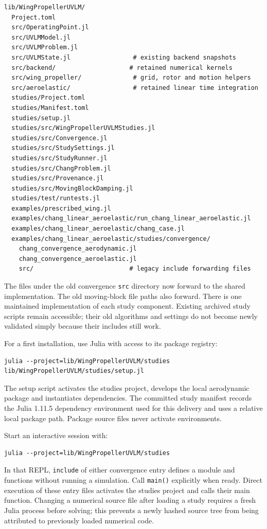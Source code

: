 \documentclass[11pt,a4paper]{article}
\newcommand{\code}{\nolinkurl}
\begin{document}
\begin{lstlisting}
lib/WingPropellerUVLM/
  Project.toml
  src/OperatingPoint.jl
  src/UVLMModel.jl
  src/UVLMProblem.jl
  src/UVLMState.jl                 # existing backend snapshots
  src/backend/                    # retained numerical kernels
  src/wing_propeller/              # grid, rotor and motion helpers
  src/aeroelastic/                 # retained linear time integration
  studies/Project.toml
  studies/Manifest.toml
  studies/setup.jl
  studies/src/WingPropellerUVLMStudies.jl
  studies/src/Convergence.jl
  studies/src/StudySettings.jl
  studies/src/StudyRunner.jl
  studies/src/ChangProblem.jl
  studies/src/Provenance.jl
  studies/src/MovingBlockDamping.jl
  studies/test/runtests.jl
  examples/prescribed_wing.jl
  examples/chang_linear_aeroelastic/run_chang_linear_aeroelastic.jl
  examples/chang_linear_aeroelastic/chang_case.jl
  examples/chang_linear_aeroelastic/studies/convergence/
    chang_convergence_aerodynamic.jl
    chang_convergence_aeroelastic.jl
    src/                          # legacy include forwarding files
\end{lstlisting}

The files under the old convergence \code{src} directory now forward to the
shared implementation. The old moving-block file paths also forward. There
is one maintained implementation of each study component. Existing archived
study scripts remain accessible; their old algorithms and settings do not
become newly validated simply because their includes still work.

For a first installation, use Julia with access to its package registry:
\begin{lstlisting}
julia --project=lib/WingPropellerUVLM/studies lib/WingPropellerUVLM/studies/setup.jl
\end{lstlisting}
The setup script activates the studies project, develops the local aerodynamic
package and instantiates dependencies. The committed study manifest records
the Julia 1.11.5 dependency environment used for this delivery and uses a
relative local package path. Package source files never activate environments.

Start an interactive session with:
\begin{lstlisting}
julia --project=lib/WingPropellerUVLM/studies
\end{lstlisting}
In that REPL, \code{include} of either convergence entry defines a module
and functions without running a simulation. Call \code{main()} explicitly when ready. Direct execution of these
entry files activates the studies project and calls their main function.
Changing a numerical source file after loading a study requires a fresh Julia
process before solving; this prevents a newly hashed source tree from being
attributed to previously loaded numerical code.
\end{document}
